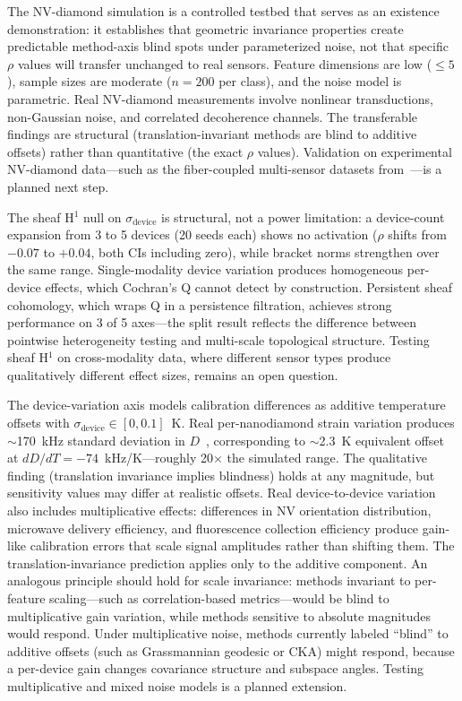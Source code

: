 \documentclass[11pt]{article}
\begin{document}
The NV-diamond simulation is a controlled testbed that serves as an
existence demonstration: it establishes that geometric invariance
properties create predictable method-axis blind spots under
parameterized noise, not that specific $\rho$ values will transfer
unchanged to real sensors.  Feature dimensions are low ($\leq 5$),
sample sizes are moderate ($n = 200$ per class), and the noise model
is parametric.  Real NV-diamond measurements involve nonlinear
transductions, non-Gaussian noise, and correlated decoherence channels.
The transferable findings are structural (translation-invariant methods
are blind to additive offsets) rather than quantitative (the exact
$\rho$ values).  Validation on experimental NV-diamond data---such as the fiber-coupled
multi-sensor datasets from~\citet{rajpal2025evaluating}---is a planned
next step.

The sheaf H$^1$ null on $\sigma_\text{device}$ is structural, not a
power limitation: a device-count expansion from 3 to 5 devices (20
seeds each) shows no activation ($\rho$ shifts from $-0.07$ to
$+0.04$, both CIs including zero), while bracket norms strengthen
over the same range.  Single-modality device variation produces
homogeneous per-device effects, which Cochran's Q cannot detect by
construction.  Persistent sheaf cohomology, which wraps Q in a
persistence filtration, achieves strong performance on 3 of 5
axes---the split result reflects the difference between pointwise
heterogeneity testing and multi-scale topological structure.  Testing
sheaf H$^1$ on cross-modality data, where different sensor types
produce qualitatively different effect sizes, remains an open
question.

The device-variation axis models calibration differences as additive
temperature offsets with $\sigma_\text{device} \in [0, 0.1]$~K.
Real per-nanodiamond strain variation produces $\sim$170~kHz standard
deviation in $D$~\citep{fujiwara2024fluorescent}, corresponding to
$\sim$2.3~K equivalent offset at $dD/dT = -74$~kHz/K---roughly 20$\times$
the simulated range.  The qualitative finding (translation invariance
implies blindness) holds at any magnitude, but sensitivity values may
differ at realistic offsets.  Real device-to-device variation also
includes multiplicative effects: differences in NV orientation
distribution, microwave delivery efficiency, and fluorescence collection
efficiency produce gain-like calibration errors that scale signal
amplitudes rather than shifting them.  The translation-invariance prediction applies only
to the additive component.  An analogous principle should hold for
scale invariance: methods invariant to per-feature scaling---such as
correlation-based metrics---would be blind to multiplicative gain
variation, while methods sensitive to absolute magnitudes would respond.
Under multiplicative noise, methods currently labeled ``blind'' to
additive offsets (such as Grassmannian geodesic or CKA) might respond,
because a per-device gain changes covariance structure and subspace
angles.  Testing multiplicative and mixed noise models is a planned
extension.
\end{document}
